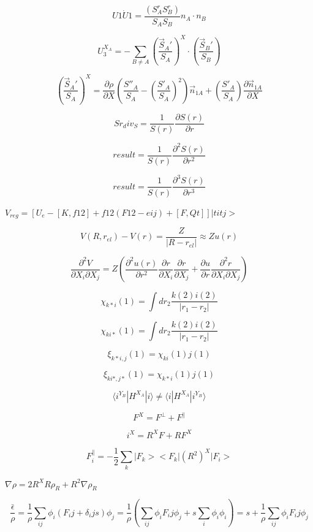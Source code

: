 \documentclass{article}
\begin{document}
\[
 U1\dot U1 = \frac{\left(S^r_A S^r_B\right)}{S_A S_B} n_A \cdot n_B
\]
\pagebreak

\[
U_3^{X_A} = -\sum_{B\neq A}\left(\frac{\vec S_A'}{S_A}\right)^X\cdot\left(\frac{\vec S_B'}{S_B}\right)
\]
\pagebreak

\[
\left(\frac{\vec S_A'}{S_A}\right)^X =
    \frac{\partial \rho}{\partial X}\left(\frac{S''_A}{S_A}
         -\left(\frac{S'_A}{S_A}\right)^2\right)\vec n_{1A}
    + \left(\frac{S'_A}{S_A}\right)\frac{\partial \vec n_{1A}}{\partial X}
\]
\pagebreak

\[
    Sr_div_S = \frac{1}{S(r)}\frac{\partial S(r)}{\partial r}
\]
\pagebreak

\[
    result = \frac{1}{S(r)}\frac{\partial^2 S(r)}{\partial r^2}
\]
\pagebreak

\[
   result = \frac{1}{S(r)}\frac{\partial^3 S(r)}{\partial r^3}
\]
\pagebreak

$ V_{reg} = [ U_e - [K,f12] + f12(F12-eij) + [F,Qt] ]|titj> $
\pagebreak

\[
V(R,r_{el}) -V(r) =\frac{Z}{|R-r_{el}|} \approx Z u(r) \]
\pagebreak

\[
\frac{\partial^2 V}{\partial X_i\partial X_j}
  =  Z \left(\frac{\partial^2 u(r)}{\partial r^2} \frac{\partial r}{\partial X_i}
     \frac{\partial r}{\partial X_j} + \frac{\partial u}{\partial r}
     \frac{\partial^2 r}{\partial X_i \partial X_j}\right)
\]
\pagebreak

\[ \chi_{k{*} i}(1) = \int dr_2 \frac{k(2) i(2)}{|r_1-r_2|} \]
\pagebreak

\[ \chi_{ki{*}}(1) = \int dr_2 \frac{k(2) i(2)}{|r_1-r_2|} \]
\pagebreak

\[ \xi_{k{*}i,j}(1) = \chi_{ki}(1) j(1) \]
\pagebreak

\[ \xi_{ki{*},j{*}}(1) = \chi_{k{*}i}(1) j(1) \]
\pagebreak

\[
 \langle i^{Y_B}|H^{X_A}|i\rangle \neq \langle i|H^{X_A}|i^{Y_B}\rangle
\]
\pagebreak

\[
    F^X = F^\perp + F^\parallel
\]
\pagebreak

\[
  i^X   = R^X F + R F^X
\]
\pagebreak

\[
 F_i^\parallel = -\frac{1}{2}\sum_k|F_k ><F_k | (R^2)^X | F_i>
\]
\pagebreak

$ \nabla\rho = 2R^X R \rho_R + R^2\nabla \rho_R $
\pagebreak

\[
\frac{\bar \epsilon}{\rho} = \frac{1}{\rho}\sum_{ij}\phi_i(F_ij+\delta_ij s)\phi_j
       = \frac{1}{\rho} ( \sum_{ij}\phi_i F_ij \phi_j + s\sum_i\phi_i\phi_i )
       = s + \frac{1}{\rho} \sum_{ij}\phi_i F_ij \phi_j
\]
\pagebreak
\end{document}
